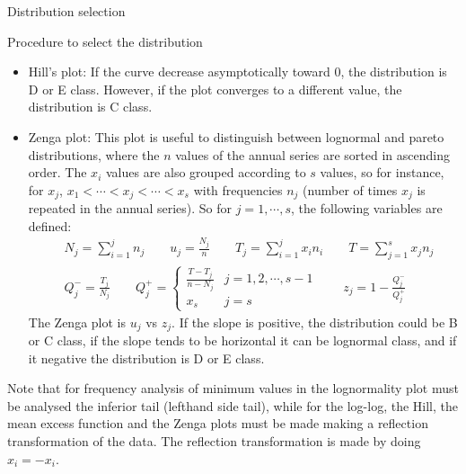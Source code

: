 \documentclass[8pt]{beamer}
\renewcommand{\emph}[1]{\textcolor{myorange}{#1}}
\begin{document}
\begin{frame}{Distribution selection}
    \vspace{-3pt}
    \begin{block}{Procedure to select the distribution}
    \end{block}
    \begin{itemize}
        \item \alert{Hill's plot}: If the curve decrease asymptotically toward 0, the distribution is D or E class. However, if the plot converges to a different value, the distribution is C class. 
        \item \alert{Zenga plot}: This plot is useful to distinguish between \emph{lognormal} and \emph{pareto} distributions, where the $n$ values of the annual series are sorted in ascending order. The $x_i$ values are also grouped  according to $s$ values, so for instance, for $x_j$, $x_1 < \cdots < x_j < \cdots < x_s$ with frequencies $n_j$ (number of times $x_j$ is repeated in the annual series). So for $j = 1, \cdots, s$, the following variables are defined:
            \begin{align*}
                &N_j = \sum_{i=1}^j n_j \quad \quad u_j = \frac{N_j}{n} \quad \quad T_j = \sum_{i=1}^j x_i n_i \quad \quad T = \sum_{j=1}^s x_j n_j \\
                &Q_j^- = \frac{T_j}{N_j} \quad \quad Q_j^+ = \begin{cases} \frac{T-T_j}{n-N_j} &  j= 1,2,\cdots,s-1  \\ x_s & j=s \end{cases} \quad \quad z_j = 1-\frac{Q_j^-}{Q_j^+}
            \end{align*}
            The \emph{Zenga plot} is $u_j$ vs $z_j$. If the \emph{slope} is positive, the distribution could be B or C class, if the \emph{slope} tends to be horizontal it can be lognormal class, and if it negative the distribution is D or E class. 
    \end{itemize}
    Note that for frequency analysis of \emph{minimum values} in the \emph{lognormality plot} must be analysed the inferior tail (lefthand side tail), while for the \emph{log-log}, the \emph{Hill}, the \emph{mean excess function} and the \emph{Zenga} plots must be made making a reflection transformation of the data. The \emph{reflection transformation} is made by doing $x_i = - x_i$.
 
\end{frame}
\end{document}
